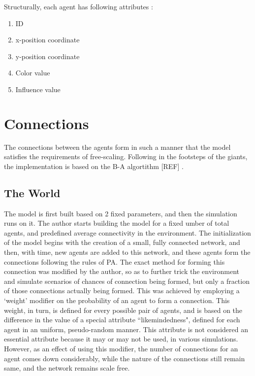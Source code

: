 Structurally, each agent has following attributes :

\begin{enumerate}
\item ID
\item x-position coordinate
\item y-position coordinate
\item Color value
\item Influence value
\end{enumerate}


\section{Connections}
The connections between the agents form in such a manner that the model satisfies the requirements of free-scaling. 
Following in the footsteps of the giants, the implementation is based on the B-A algortithm [REF] .

\subsection{The World}
The model is first built based on 2 fixed parameters, and then the simulation runs on it.
The author starts building the model for a fixed umber of total agents, and predefined average connectivity in the environment.
The initialization of the model begins with the creation of a small, fully connected network, and then, with time, new agents are added to this network, and these agents form the connections following the rules of PA.
The exact method for forming this connection was modified by the author, so as to further trick the environment and simulate scenarios of chances of connection being formed, but only a fraction of those connections actually being formed. This was achieved by employing a `weight' modifier on the probability of an agent to form a connection. This weight, in turn, is defined for every possible pair of agents, and is based on the difference in the value of a special attribute ``likemindedness", defined for each agent in an uniform, pseudo-random manner.
This attribute is not considered an essential attribute because it may or may not be used, in various simulations. However, as an effect of using this modifier, the number of connections for an agent comes down considerably, while the nature of the connections still remain same, and the network remains scale free.


